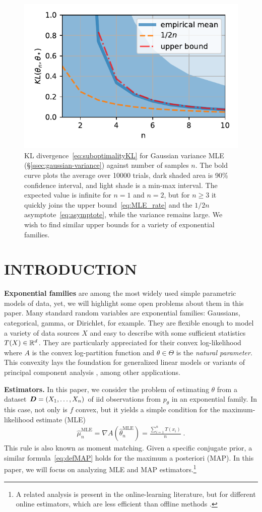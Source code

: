 \documentclass[twoside]{article}
\let\oldsection\section
\renewcommand{\section}[1]{\oldsection{\texorpdfstring{\uppercase{#1}}{#1}}}
\newcommand{\logpart}{A}
\newcommand{\nat}{\theta}
\newcommand{\lin}[1]{\left\langle#1\right\rangle}
\begin{document}
\begin{figure}[t]
	\centering
\includegraphics[width=.4\textwidth]{fewsamples.pdf}
	\caption{KL divergence~\eqref{eq:suboptimalityKL} for Gaussian variance MLE (\S\ref{ssec:gaussian-variance}) against number of samples $n$. The bold curve plots the average over 10000 trials,  dark shaded area is 90\% confidence interval, and light shade is a min-max interval.
		The expected value is infinite for $n=1$ and $n=2$, but for $n\geq3$ it quickly joins the upper bound~\eqref{eq:MLE_rate} and the $1/2n$ asymptote~\eqref{eq:asymptote}, while the variance remains large.
		We wish to find similar upper bounds for a variety of exponential families.
	}
	\label{fig:curves}
\end{figure}


\section{Introduction}
\label{sec:motivation}

{\bf Exponential families} are among the most widely used simple parametric models of data, yet, we will highlight some open problems about them in this paper.
Many standard random variables are exponential families: Gaussians, categorical, gamma, or Dirichlet, for example.
They are flexible enough to model a variety of data sources $X$ and easy to describe with some sufficient statistics $T(X) \in \mathbb{R}^d$.
They are particularly appreciated for their convex log-likelihood
\alignn{
f(\nat) := \E[-\log p_\nat(X)] = \logpart(\nat) - \lin{\E[T(X)] , \nat},
\label{eq:defNLL}
}
where $\logpart$ is the convex log-partition function and $\nat\in\Theta$ is the \textit{natural parameter}.
This convexity lays the foundation for generalized linear models \citep{mccullagh1989generalized} or variants of principal component analysis \citep{collins2001generalization}, among other applications.

{\bf Estimators.}
In this paper, we consider the problem of estimating $\nat$ from a dataset ${\bm{D}} = (X_1, \dots, X_n)$ of iid observations from $p_\theta$ in an exponential family.
In this case, not only is $f$ convex, but it yields a simple condition for the maximum-likelihood estimate (MLE)
\begin{align}
 \hat \mu_n^\text{MLE} = \nabla  \logpart(\hat \nat_n^\text{MLE}) = \frac{\sum_{i=1}^n T(x_i)}{n} \; .
	\label{eq:defMLE}
\end{align}
This rule is also known as moment matching.
Given a specific conjugate prior, a similar formula~\eqref{eq:defMAP} holds for the maximum a posteriori (MAP). In this paper, we will focus on analyzing MLE and MAP estimators.\footnote{A related analysis is present in the online-learning literature, but for different online estimators, which are less efficient than offline methods \citep{azoury2001relative,dasgupta2007online}.}
\end{document}
